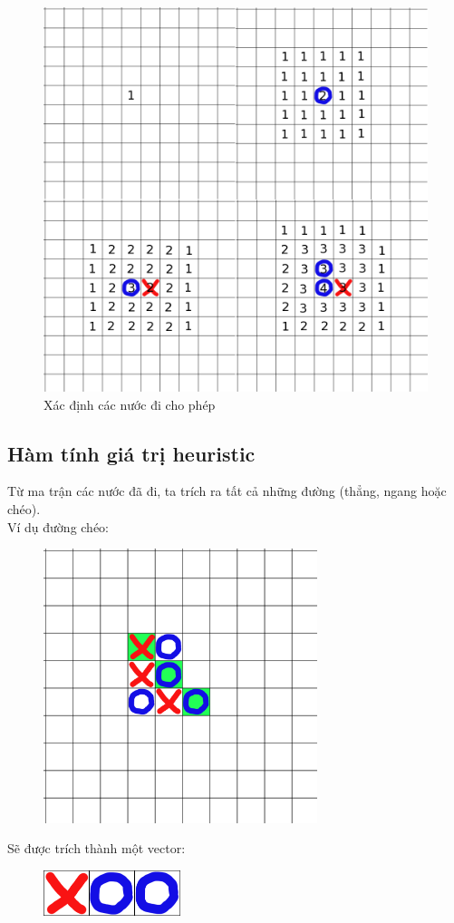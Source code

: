 \documentclass[12pt]{report}
\begin{document}
\begin{figure}[H]
\centering
\caption{Xác định các nước đi cho phép}
\includegraphics[width=\textwidth]{legal-action-impl.png}
\end{figure}

\subsection{Hàm tính giá trị heuristic}

Từ ma trận các nước đã đi, ta trích ra tất cả những đường (thẳng, ngang hoặc chéo). \\
Ví dụ đường chéo: 
\begin{figure}[H]
\centering
\includegraphics[width=8cm]{matrix-line.png}
\end{figure}
\noindent Sẽ được trích thành một vector: 
\begin{figure}[H]
\centering
\includegraphics[width=4cm]{line.png}
\end{figure}
\end{document}
